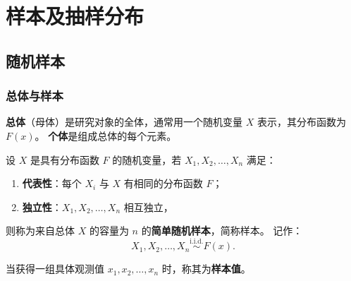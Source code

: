 \chapter{样本及抽样分布}

\section{随机样本}

\subsection{总体与样本}

\begin{definition}[总体与个体]
\textbf{总体}（母体）是研究对象的全体，通常用一个随机变量 $X$ 表示，其分布函数为 $F(x)$。
\textbf{个体}是组成总体的每个元素。
\end{definition}

\begin{definition}[简单随机样本]
设 $X$ 是具有分布函数 $F$ 的随机变量，若 $X_1, X_2, \dots, X_n$ 满足：
\begin{enumerate}[label=(\roman*)]
    \item \textbf{代表性}：每个 $X_i$ 与 $X$ 有相同的分布函数 $F$；
    \item \textbf{独立性}：$X_1, X_2, \dots, X_n$ 相互独立，
\end{enumerate}
则称为来自总体 $X$ 的容量为 $n$ 的\textbf{简单随机样本}，简称样本。
记作：
\begin{equation}
    X_1, X_2, \dots, X_n \stackrel{\mathrm{i.i.d.}}{\sim} F(x).
\end{equation}
\end{definition}

当获得一组具体观测值 $x_1, x_2, \dots, x_n$ 时，称其为\textbf{样本值}。

